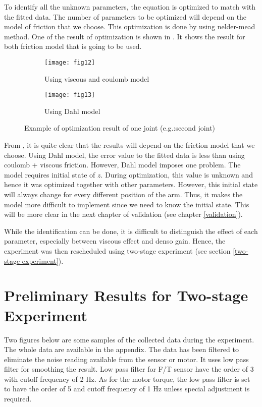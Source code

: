 To identify all the unknown parameters, the equation is optimized to match with the fitted data. The number of parameters to be optimized will depend on the model of friction that we choose. This optimization is done by using nelder-mead method. One of the result of optimization is shown in . It shows the result for both friction model that is going to be used.

 
\begin{figure}[H]
  \begin{subfigure}[t]{0.5\textwidth}
    \centering
    \texttt{[image: fig12]} 
    \caption{Using viscous and coulomb model}
  \end{subfigure}
  \begin{subfigure}[t]{0.5\textwidth}
    \centering
    \texttt{[image: fig13]}
    \caption{Using Dahl model}
  \end{subfigure}
  \caption{Example of optimization result of one joint (e.g.:second joint)}
  \label{fig:optimization}
\end{figure}

From , it is quite clear that the results will depend on the friction model that we choose. Using Dahl model, the error value to the fitted data is less than using coulomb + viscous friction. However, Dahl model imposes one problem. The model requires initial state of $z$. During optimization, this value is unknown and hence it was optimized together with other parameters. However, this initial state will always change for every different position of the arm. Thus, it makes the model more difficult to implement since we need to know the initial state. This will be more clear in the next chapter of validation (see chapter \ref{validation}).

While the identification can be done, it is difficult to distinguish the effect of each parameter, especially between viscous effect and denso gain. Hence, the experiment was then rescheduled using two-stage experiment (see section \ref{two-stage experiment}).

\section{Preliminary Results for Two-stage Experiment}
Two figures below are some samples of the collected data during the experiment. The whole data are available in the appendix. The data has been filtered to eliminate the noise reading available from the sensor or motor. It uses low pass filter for smoothing the result. Low pass filter for F/T sensor have the order of 3 with cutoff frequency of 2 Hz. As for the motor torque, the low pass filter is set to have the order of 5 and cutoff frequency of 1 Hz unless special adjustment is required.

